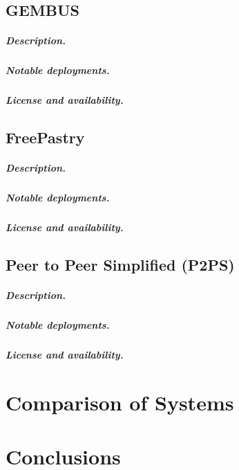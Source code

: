 \documentclass[a4paper]{report}
\begin{document}
\section{GEMBUS}

\paragraph{Description.}

\paragraph{Notable deployments.}

\paragraph{License and availability.}


\section{FreePastry}

\paragraph{Description.}

\paragraph{Notable deployments.}

\paragraph{License and availability.}


\section{Peer to Peer Simplified (P2PS)}

\paragraph{Description.}

\paragraph{Notable deployments.}

\paragraph{License and availability.}




\chapter{Comparison of Systems}

\chapter{Conclusions}
\end{document}
